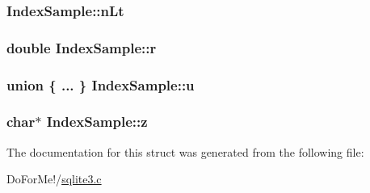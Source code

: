 \hypertarget{struct_index_sample_a5e2391cced4ee840bc7e168372a836c5}{
\subsubsection[{n\-Lt}]{ Index\-Sample\-::n\-Lt}}\label{struct_index_sample_a5e2391cced4ee840bc7e168372a836c5}
\hypertarget{struct_index_sample_af93b8b9aefc9739a284acf348194914b}{
\subsubsection[{r}]{\setlength{\rightskip}{0pt plus 5cm}double Index\-Sample\-::r}}\label{struct_index_sample_af93b8b9aefc9739a284acf348194914b}
\hypertarget{struct_index_sample_a9ffe58e380be7cabb6e35dc32dff3322}{
\subsubsection[{u}]{\setlength{\rightskip}{0pt plus 5cm}union \{ ... \}   Index\-Sample\-::u}}\label{struct_index_sample_a9ffe58e380be7cabb6e35dc32dff3322}
\hypertarget{struct_index_sample_a7f4ec4ee783dafe31debf8c04b13e4dd}{
\subsubsection[{z}]{\setlength{\rightskip}{0pt plus 5cm}char$\ast$ Index\-Sample\-::z}}\label{struct_index_sample_a7f4ec4ee783dafe31debf8c04b13e4dd}


The documentation for this struct was generated from the following file\-:\begin{DoxyCompactItemize}
\item 
Do\-For\-Me!/\hyperlink{sqlite3_8c}{sqlite3.\-c}\end{DoxyCompactItemize}
